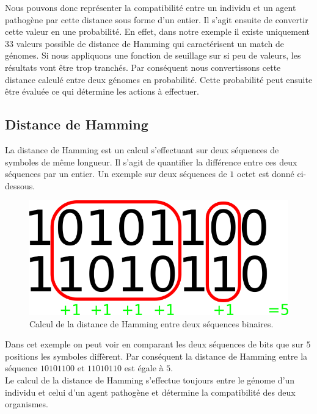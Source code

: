 Nous pouvons donc représenter la compatibilité entre un individu et un agent pathogène par cette distance sous forme d'un entier. Il s'agit ensuite de convertir cette valeur en une probabilité. En effet, dans notre exemple il existe uniquement $33$ valeurs possible de distance de Hamming qui caractérisent un match de génomes. Si nous appliquons une fonction de seuillage sur si peu de valeurs, les résultats vont être trop tranchés. Par conséquent nous convertissons cette distance calculé entre deux génomes en probabilité. Cette probabilité peut ensuite être évaluée ce qui détermine les actions à effectuer.\\

\subsection{Distance de Hamming}

La distance de Hamming est un calcul s'effectuant sur deux séquences de symboles de même longueur. Il s'agit de quantifier la différence entre ces deux séquences par un entier. Un exemple sur deux séquences de $1$ octet est donné ci-dessous.\\

\begin{figure}[h]
	\centering
	\captionsetup{justification=centering}
	\includegraphics[scale=1]{Images/hamming.png}
	\caption[Calcul de la distance de Hamming]{Calcul de la distance de Hamming entre deux séquences binaires.}
\end{figure}

Dans cet exemple on peut voir en comparant les deux séquences de bits que sur $5$ positions les symboles diffèrent. Par conséquent la distance de Hamming entre la séquence $10101100$ et $11010110$ est égale à $5$.\\

Le calcul de la distance de Hamming s'effectue toujours entre le génome d'un individu et celui d'un agent pathogène et détermine la compatibilité des deux organismes.\\

